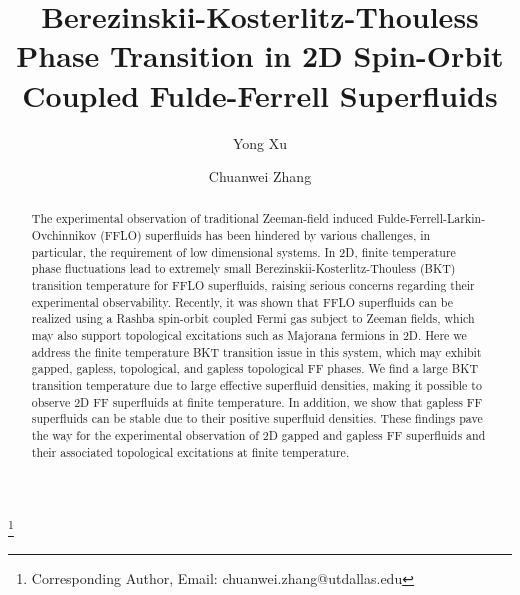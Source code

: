 \documentclass[prl,aps,twocolumn,showpacs, floatfix]{revtex4}
\begin{document}
\title{Berezinskii-Kosterlitz-Thouless Phase Transition in 2D Spin-Orbit
Coupled Fulde-Ferrell Superfluids}
\author{Yong Xu}
\author{Chuanwei Zhang}
\thanks{Corresponding Author, Email: chuanwei.zhang@utdallas.edu}

\begin{abstract}
The experimental observation of traditional Zeeman-field induced
Fulde-Ferrell-Larkin-Ovchinnikov (FFLO) superfluids has been hindered by
various challenges, in particular, the requirement of low dimensional
systems. In 2D, finite temperature phase fluctuations lead to extremely
small Berezinskii-Kosterlitz-Thouless (BKT) transition temperature for FFLO
superfluids, raising serious concerns regarding their experimental
observability. Recently, it was shown that FFLO superfluids can be realized
using a Rashba spin-orbit coupled Fermi gas subject to Zeeman fields, which
may also support topological excitations such as Majorana fermions in 2D.
Here we address the finite temperature BKT transition issue in this system,
which may exhibit gapped, gapless, topological, and gapless topological FF
phases. We find a large BKT transition temperature due to large effective
superfluid densities, making it possible to observe 2D FF superfluids at
finite temperature. In addition, we show that gapless FF superfluids can be
stable due to their positive superfluid densities. These findings pave the
way for the experimental observation of 2D gapped and gapless FF superfluids
and their associated topological excitations at finite temperature.
\end{abstract}

\maketitle
\end{document}
